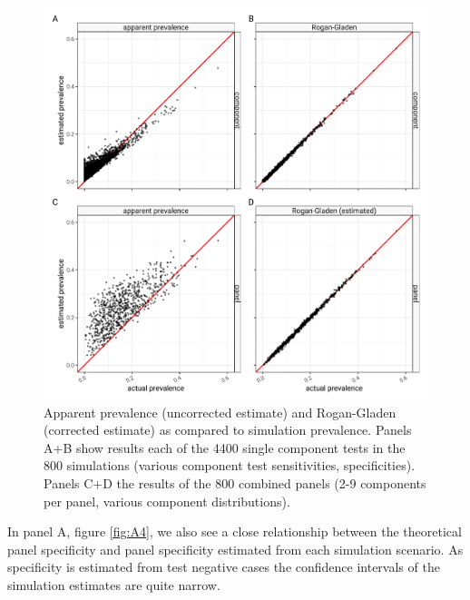 \documentclass[a4paper, 12pt, twoside]{article}
\begin{document}
\begin{figure}[h!]
\centering
  \includegraphics{fig/qq-prevalence-prediction-v-simulation.png}
  \caption{Apparent prevalence (uncorrected estimate) and Rogan-Gladen (corrected estimate) as compared to simulation prevalence. Panels A+B show results each of the 4400 single component tests in the 800 simulations (various component test sensitivities, specificities). Panels C+D the results of the 800 combined panels (2-9 components per panel, various component distributions).}
\label{fig:A3}
\end{figure}


In panel A, figure \ref{fig:A4}, we also see a close relationship between the theoretical panel specificity and panel specificity estimated from each simulation scenario. As specificity is estimated from test negative cases the confidence intervals of the simulation estimates are quite narrow.
\end{document}
